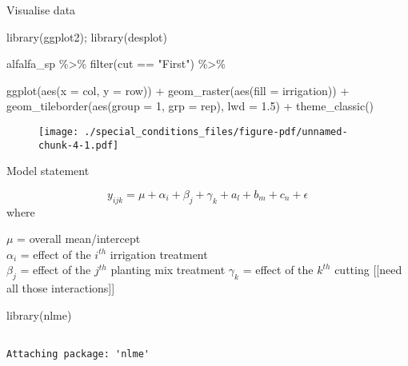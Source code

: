 \documentclass[
  letterpaper,
  DIV=11,
  numbers=noendperiod]{scrreprt}
\newenvironment{Shaded}{\begin{snugshade}}{\end{snugshade}}
\newcommand{\AttributeTok}[1]{\textcolor[rgb]{0.40,0.45,0.13}{#1}}
\newcommand{\DecValTok}[1]{\textcolor[rgb]{0.68,0.00,0.00}{#1}}
\newcommand{\FloatTok}[1]{\textcolor[rgb]{0.68,0.00,0.00}{#1}}
\newcommand{\FunctionTok}[1]{\textcolor[rgb]{0.28,0.35,0.67}{#1}}
\newcommand{\NormalTok}[1]{\textcolor[rgb]{0.00,0.23,0.31}{#1}}
\newcommand{\SpecialCharTok}[1]{\textcolor[rgb]{0.37,0.37,0.37}{#1}}
\newcommand{\StringTok}[1]{\textcolor[rgb]{0.13,0.47,0.30}{#1}}
\begin{document}
Visualise data

\begin{Shaded}
\begin{Highlighting}[]
\FunctionTok{library}\NormalTok{(ggplot2); }\FunctionTok{library}\NormalTok{(desplot)}

\NormalTok{alfalfa\_sp }\SpecialCharTok{\%\textgreater{}\%} \FunctionTok{filter}\NormalTok{(cut }\SpecialCharTok{==} \StringTok{"First"}\NormalTok{) }\SpecialCharTok{\%\textgreater{}\%} 
  
\FunctionTok{ggplot}\NormalTok{(}\FunctionTok{aes}\NormalTok{(}\AttributeTok{x =}\NormalTok{ col, }\AttributeTok{y =}\NormalTok{ row)) }\SpecialCharTok{+}
  \FunctionTok{geom\_raster}\NormalTok{(}\FunctionTok{aes}\NormalTok{(}\AttributeTok{fill =}\NormalTok{ irrigation)) }\SpecialCharTok{+}
  \FunctionTok{geom\_tileborder}\NormalTok{(}\FunctionTok{aes}\NormalTok{(}\AttributeTok{group =} \DecValTok{1}\NormalTok{, }\AttributeTok{grp =}\NormalTok{ rep), }\AttributeTok{lwd =} \FloatTok{1.5}\NormalTok{) }\SpecialCharTok{+} 
  \FunctionTok{theme\_classic}\NormalTok{()}
\end{Highlighting}
\end{Shaded}

\begin{figure}[H]

{\centering \texttt{[image: ./special\_conditions\_files/figure-pdf/unnamed-chunk-4-1.pdf]}

}

\end{figure}

Model statement

\[y_{ijk} = \mu + \alpha_i+\beta_j + \gamma_k + a_l + b_m + c_n + \epsilon_{}\]
where

\(\mu\) = overall mean/intercept\\
\(\alpha_i\) = effect of the \(i^{th}\) irrigation treatment\\
\(\beta_j\) = effect of the \(j^{th}\) planting mix treatment
\(\gamma_k\) = effect of the \(k^{th}\) cutting {[}{[}need all those
interactions{]}{]}

\begin{Shaded}
\begin{Highlighting}[]
\FunctionTok{library}\NormalTok{(nlme)}
\end{Highlighting}
\end{Shaded}

\begin{verbatim}

Attaching package: 'nlme'
\end{verbatim}
\end{document}
